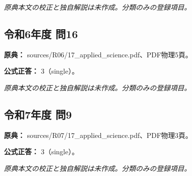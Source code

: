 \par\textit{原典本文の校正と独自解説は未作成。分類のみの登録項目。}

\subsection{令和6年度 問16}
\label{q:r06-reg-applied-16}

\noindent\textbf{原典：} sources/R06/17\_applied\_science.pdf、PDF物理5頁。

\textbf{公式正答：} 3（single）。

\par\textit{原典本文の校正と独自解説は未作成。分類のみの登録項目。}

\subsection{令和7年度 問9}
\label{q:r07-reg-applied-09}

\noindent\textbf{原典：} sources/R07/17\_applied\_science.pdf、PDF物理3頁。

\textbf{公式正答：} 3（single）。

\par\textit{原典本文の校正と独自解説は未作成。分類のみの登録項目。}
